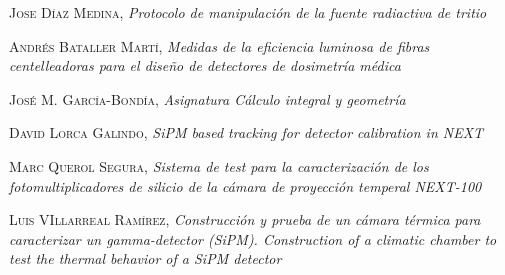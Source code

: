 \begin{thebibliography}{99}
 \textsc{Jose Díaz Medina},
\textit{Protocolo de manipulación de la fuente radiactiva de tritio}

 \textsc{Andrés Bataller Martí},
\textit{Medidas de la eficiencia luminosa de fibras centelleadoras para el diseño de detectores de dosimetría médica}

 \textsc{José M. García-Bondía},
\textit{Asignatura Cálculo integral y geometría}

 \textsc{David Lorca Galindo},
\textit{SiPM based tracking for detector calibration in NEXT}

 \textsc{Marc Querol Segura},
\textit{Sistema de test para la caracterización de los fotomultiplicadores de silicio de la cámara de proyección temperal NEXT-100}

 \textsc{Luis VIllarreal Ramírez},
\textit{Construcción y prueba de un cámara térmica para caracterizar un gamma-detector (SiPM). Construction of a climatic chamber to test the thermal behavior of a SiPM detector}
 
\end{thebibliography}